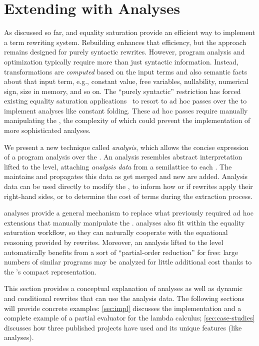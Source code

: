 \section{Extending \Egraphs with \Eclass Analyses}
\label{sec:extensions}

As discussed so far, \egraphs and equality saturation provide an efficient way
  to implement a term rewriting system.
Rebuilding enhances that efficiency, but the approach remains designed for
  purely syntactic rewrites.
However, program analysis and optimization typically require more than just
  syntactic information.
Instead, transformations are \emph{computed} based on the input terms and also semantic facts
  about that input term, e.g., constant value, free variables, nullability,
  numerical sign, size in memory, and so on.
The ``purely syntactic'' restriction has forced existing equality saturation
  applications~\cite{eqsat, eqsat-llvm, herbie} to
  resort to ad hoc passes over the \egraph
  to implement analyses like constant folding.
These ad hoc passes require manually manipulating the \egraph,
  the complexity of which could prevent the implementation of more sophisticated
  analyses.

We present a new technique called \textit{\eclass analysis},
  which allows the concise
  expression of a program analysis over the \egraph.
An \eclass analysis resembles abstract interpretation
  lifted to the \egraph level,
  attaching \textit{analysis data} from a semilattice to each \eclass.
The \egraph maintains and propagates this data as
  \eclasses get merged and new \enodes are added.
Analysis data can be used directly to modify the \egraph, to inform
  how or if rewrites apply their right-hand sides, or to determine the cost of
  terms during the extraction process.

\Eclass analyses provide a general mechanism to replace what previously
  required ad hoc extensions that manually manipulate the \egraph.
\Eclass analyses also fit within the equality saturation workflow,
  so they can naturally cooperate with the equational reasoning provided by
  rewrites.
Moreover, an analysis lifted to the \egraph level automatically benefits from a
  sort of ``partial-order reduction'' for free:
  large numbers of similar programs may be analyzed for little additional cost
  thanks to the \egraph's compact representation.

This section provides a conceptual explanation of \eclass analyses as well
  as dynamic and conditional rewrites that can use the analysis data.
The following sections will provide concrete examples:
  \autoref{sec:impl} discusses the \egg implementation and a complete example of a
  partial evaluator for the lambda calculus;
  \autoref{sec:case-studies} discusses how three published projects have used
  \egg and its unique features (like \eclass analyses).


